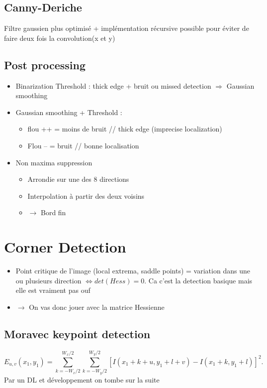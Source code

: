 \documentclass{article}
\theoremstyle{plain}%
\theoremstyle{definition}
\theoremstyle{remark}
\begin{document}
\subsection{Canny-Deriche}
Filtre gaussien plus optimisé + implémentation récursive possible pour éviter de faire deux fois la convolution(x et y)

\subsection{Post processing}
\begin{itemize}
    \item Binarization Threshold : thick edge + bruit ou missed detection $\Rightarrow$ Gaussian smoothing 
    \item Gaussian smoothing + Threshold : \begin{itemize}
        \item flou ++ = moins de bruit // thick edge (imprecise localization)
        \item Flou -- = bruit // bonne localisation
    \end{itemize}
    \item Non maxima suppression \begin{itemize}
        \item Arrondie sur une des 8 directions 
        \item Interpolation à partir des deux voisins 
        \item $\rightarrow$ Bord fin 
    \end{itemize}
\end{itemize}


\section{Corner Detection}
\begin{itemize}
    \item Point critique de l'image (local extrema, saddle points) = variation dans une ou plusieurs direction $ \Leftrightarrow det(Hess) = 0 $. Ca c'est la detection basique mais elle est vraiment pas ouf
    \item $\rightarrow$ On vas donc jouer avec la matrice Hessienne
\end{itemize}

\subsection{Moravec keypoint detection}
\[
    E_{u,v}(x_1, y_1) = \sum_{k = -W_x/2}^{W_x/2} \sum_{k = -W_y/2}^{W_y/2} [I(x_1 + k + u, y_1 + l + v) - I(x_1 + k, y_1 + l)]^2
.\]
Par un DL et développement on tombe sur la suite 
\end{document}
